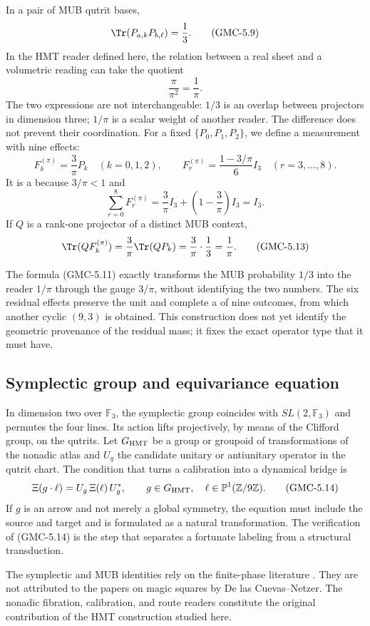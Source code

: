 In a pair of MUB qutrit bases,
\[
 \Tr(P_{a,k}P_{b,\ell})=\frac13.
 \tag{GMC-5.9}
\]
In the HMT reader defined here, the relation between a real sheet and a
volumetric reading can take the quotient
\[
 \frac{\pi}{\pi^2}=\frac1\pi.
 \tag{GMC-5.10}
\]
The two expressions are not interchangeable: $1/3$ is an overlap between
projectors in dimension three; $1/\pi$ is a scalar weight of another reader.
The difference does not prevent their coordination. For a fixed \PVM
$\{P_0,P_1,P_2\}$, we define a measurement with nine effects:
\[
 F_k^{(\pi)}=\frac3\pi P_k\quad(k=0,1,2),
 \qquad
 F_r^{(\pi)}=\frac{1-3/\pi}{6}I_3\quad(r=3,\ldots,8).
 \tag{GMC-5.11}
\]
It is a \POVM because $3/\pi<1$ and
\[
 \sum_{r=0}^{8}F_r^{(\pi)}
 =\frac3\pi I_3+\left(1-\frac3\pi\right)I_3=I_3.
 \tag{GMC-5.12}
\]
If $Q$ is a rank-one projector of a distinct MUB context,
\[
 \Tr(QF_k^{(\pi)})
 =\frac3\pi\Tr(QP_k)
 =\frac3\pi\cdot\frac13
 =\frac1\pi.
 \tag{GMC-5.13}
\]

\begin{bridgebox}
The formula \textup{(GMC-5.11)} exactly transforms the MUB probability $1/3$ into the reader $1/\pi$ through the gauge $3/\pi$, without identifying the two numbers. The six residual effects preserve the unit and complete a \POVM of nine outcomes, from which another cyclic \QMS $(9,3)$ is obtained. This construction does not yet identify the geometric provenance of the residual mass; it fixes the exact operator type that it must have.
\end{bridgebox}

\subsection{Symplectic group and equivariance equation}

In dimension two over $\mathbb F_3$, the symplectic group coincides with
$SL(2,\mathbb F_3)$ and permutes the four lines. Its action lifts
projectively, by means of the Clifford group, on the \PVM qutrits. Let
$G_{\rm HMT}$ be a group or groupoid of transformations of the nonadic atlas and
$U_g$ the candidate unitary or antiunitary operator in the qutrit chart. The
condition that turns a calibration into a dynamical bridge is
\[
 \Xi(g\cdot\ell)=U_g\,\Xi(\ell)\,U_g^*,
 \qquad
 g\in G_{\rm HMT},\quad
 \ell\in\mathbb P^1(\mathbb Z/9\mathbb Z).
\tag{GMC-5.14}
\]
If $g$ is an arrow and not merely a global symmetry, the equation must include
the source and target and is formulated as a natural transformation. The verification of
\textup{(GMC-5.14)} is the step that separates a fortunate labeling from a
structural transduction.

\begin{sourcebox}
The symplectic and MUB identities rely on the finite-phase literature
\citep{gibbons2004phase,planat2007rings}. They are not attributed to the papers on
magic squares by De las Cuevas--Netzer. The nonadic fibration, calibration,
and route readers constitute the original contribution of the
HMT construction studied here.
\end{sourcebox}
